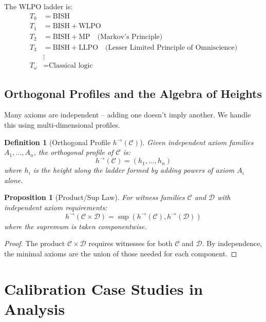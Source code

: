\documentclass[11pt]{article}
\newtheorem{definition}[theorem]{Definition}
\newtheorem{proposition}[theorem]{Proposition}
\newcommand{\WLPO}{\mathrm{WLPO}}
\newcommand{\BISH}{\mathrm{BISH}}
\begin{document}
\begin{example}
The WLPO ladder is:
\begin{align}
T_0 &= \BISH \\
T_1 &= \BISH + \WLPO \\
T_2 &= \BISH + \text{MP} \quad \text{(Markov's Principle)} \\
T_3 &= \BISH + \text{LLPO} \quad \text{(Lesser Limited Principle of Omniscience)} \\
&\vdots \\
T_\omega &= \text{Classical logic}
\end{align}
\end{example}

\subsection{Orthogonal Profiles and the Algebra of Heights}

Many axioms are independent -- adding one doesn't imply another. We handle this using multi-dimensional profiles.

\begin{definition}[Orthogonal Profile \(h^{\to}(\mathcal C)\)]
Given independent axiom families $A_1, \ldots, A_n$, the \emph{orthogonal profile} of $\mathcal{C}$ is:
\[
h^{\to}(\mathcal{C}) = (h_1, \ldots, h_n)
\]
where $h_i$ is the height along the ladder formed by adding powers of axiom $A_i$ alone.
\end{definition}

\begin{proposition}[Product/Sup Law]\label{prop:product-sup}
For witness families $\mathcal{C}$ and $\mathcal{D}$ with independent axiom requirements:
\[
h^{\to}(\mathcal{C} \times \mathcal{D}) = \sup(h^{\to}(\mathcal{C}), h^{\to}(\mathcal{D}))
\]
where the supremum is taken componentwise.
\end{proposition}
\begin{proof}
The product $\mathcal{C} \times \mathcal{D}$ requires witnesses for both $\mathcal{C}$ and $\mathcal{D}$. By independence, the minimal axioms are the union of those needed for each component.
\end{proof}

\section{Calibration Case Studies in Analysis}
\end{document}
